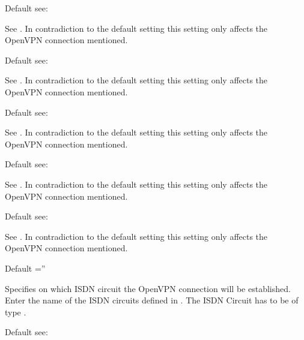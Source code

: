 \begin{description}
  Default see: 

  See . In
  contradiction to the default setting this setting only affects the OpenVPN 
  connection mentioned.


  Default see: 

  See . In
  contradiction to the default setting this setting only affects the OpenVPN 
  connection mentioned.


  Default see: 

  See . In
  contradiction to the default setting this setting only affects the OpenVPN 
  connection mentioned.


  Default see: 

  See . In
  contradiction to the default setting this setting only affects the OpenVPN 
  connection mentioned.


  Default see: 

  See . In
  contradiction to the default setting this setting only affects the OpenVPN 
  connection mentioned.


  Default =''

  Specifies on which ISDN circuit the OpenVPN connection will be established. Enter the 
  name of the ISDN circuits defined in . 
  The ISDN Circuit has to be of type .


  Default see: 


\end{description}
